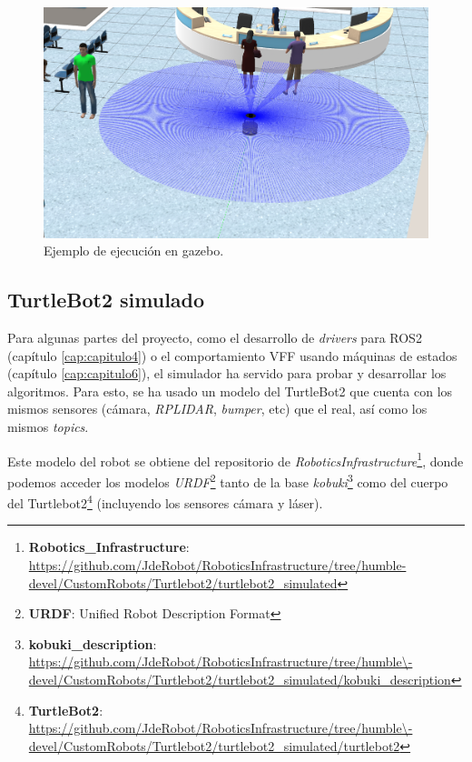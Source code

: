 \begin{figure} [H]
    \begin{center}
        \includegraphics[width=13cm]{figs/c3/gazebo_sim.png}
    \end{center}
    \caption[Simulador Gazebo.]{Ejemplo de ejecución en gazebo.}
    \label{fig:gazebo_example}
\end{figure}

\subsection{TurtleBot2 simulado}
\label{subsec:turtlebot2_sim}

Para algunas partes del proyecto, como el desarrollo de \textit{drivers} para ROS2 (capítulo \ref{cap:capitulo4}) o el comportamiento VFF usando
máquinas de estados (capítulo \ref{cap:capitulo6}), el simulador ha servido para probar y desarrollar los algoritmos. Para esto, se ha usado un modelo del
TurtleBot2 que cuenta con los mismos sensores (cámara, \textit{RPLIDAR}, \textit{bumper}, etc) que el real, así como los mismos \textit{topics}.

Este modelo del robot se obtiene del repositorio de
\textit{RoboticsInfrastructure}\footnote{\textbf{Robotics\_Infrastructure}: \url{
    https://github.com/JdeRobot/RoboticsInfrastructure/tree/humble-devel/CustomRobots/Turtlebot2/turtlebot2_simulated}},
donde podemos acceder los modelos \textit{URDF}\footnote{\textbf{URDF}: Unified Robot Description Format} tanto de la base
\textit{kobuki}\footnote{\textbf{kobuki\_description}: \url{
    https://github.com/JdeRobot/RoboticsInfrastructure/tree/humble\-devel/CustomRobots/Turtlebot2/turtlebot2_simulated/kobuki_description}}
como del cuerpo del Turtlebot2\footnote{\textbf{TurtleBot2}: \url{
    https://github.com/JdeRobot/RoboticsInfrastructure/tree/humble\-devel/CustomRobots/Turtlebot2/turtlebot2_simulated/turtlebot2}}
(incluyendo los sensores cámara y láser).

